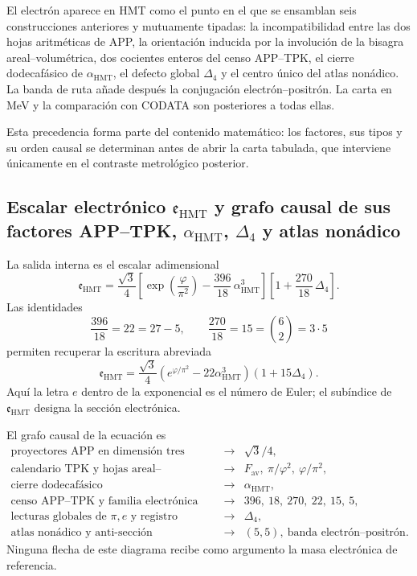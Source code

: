 El electrón aparece en HMT como el punto en el que se ensamblan seis
construcciones anteriores y mutuamente tipadas: la incompatibilidad entre
las dos hojas aritméticas de APP, la orientación inducida por la involución
de la bisagra areal--volumétrica, dos cocientes enteros del censo APP--TPK,
el cierre
dodecafásico de \(\alpha_{\mathrm{HMT}}\), el defecto global
\(\Delta_4\) y el centro único del atlas nonádico. La banda de ruta añade
después la conjugación electrón--positrón. La carta en MeV y la comparación
con CODATA son posteriores a todas ellas.

Esta precedencia forma parte del contenido matemático: los factores, sus
tipos y su orden causal se determinan antes de abrir la carta tabulada, que
interviene únicamente en el contraste metrológico posterior.

\subsection{Escalar electrónico \(\mathfrak e_{\mathrm{HMT}}\) y grafo causal de sus factores APP–TPK, \(\alpha_{\mathrm{HMT}}\), \(\Delta_4\) y atlas nonádico}

La salida interna es el escalar adimensional
\begin{equation}
 \label{p12-83-c15-s2:eq:electron-holografico-rev6}
 \boxed{
 \mathfrak e_{\mathrm{HMT}}
 =
 \frac{\sqrt3}{4}
 \left[
 \exp\!\left(\frac{\varphi}{\pi^2}\right)
 -\frac{396}{18}\,\alpha_{\mathrm{HMT}}^3
 \right]
 \left[
 1+\frac{270}{18}\,\Delta_4
 \right].}
\end{equation}
Las identidades
\[
 \frac{396}{18}=22=27-5,
 \qquad
 \frac{270}{18}=15=\binom62=3\cdot5
 \]
permiten recuperar la escritura abreviada
\[
 \mathfrak e_{\mathrm{HMT}}
 =
 \frac{\sqrt3}{4}
 \left(e^{\varphi/\pi^2}-22\alpha_{\mathrm{HMT}}^3\right)
 (1+15\Delta_4).
\]
Aquí la letra \(e\) dentro de la exponencial es el número de Euler; el
subíndice de \(\mathfrak e_{\mathrm{HMT}}\) designa la sección electrónica.

El grafo causal de la ecuación es
\[
\begin{array}{ccl}
\text{proyectores APP en dimensión tres}
&\longrightarrow& \sqrt3/4,\\[2mm]
\text{calendario TPK y hojas areal--volumétrica}
&\longrightarrow&
F_{\mathrm{av}},\ \pi/\varphi^2,\
\varphi/\pi^2,\\[2mm]
\text{cierre dodecafásico}
&\longrightarrow&\alpha_{\mathrm{HMT}},\\[2mm]
\text{censo APP--TPK y familia electrónica}
&\longrightarrow&396,\ 18,\ 270,\ 22,\ 15,\ 5,\\[2mm]
\text{lecturas globales de }\pi,e\text{ y registro}
&\longrightarrow&\Delta_4,\\[2mm]
\text{atlas nonádico y anti-sección}
&\longrightarrow&(5,5),\
\text{banda electrón--positrón}.
\end{array}
\]
Ninguna flecha de este diagrama recibe como argumento la masa electrónica
de referencia.

